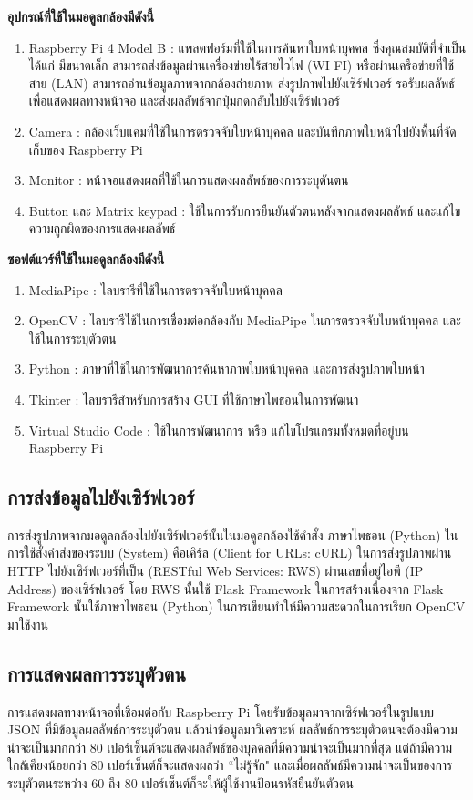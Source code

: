 \textbf{อุปกรณ์ที่ใช้ในมอดูลกล้องมีดังนี้}
\begin{enumerate}
  \item Raspberry Pi 4 Model B : แพลตฟอร์มที่ใช้ในการค้นหาใบหน้าบุคคล ซึ่งคุณสมบัติที่จำเป็นได้แก่ 
  มีขนาดเล็ก สามารถส่งข้อมูลผ่านเครื่องข่ายไร้สายไวไฟ (WI-FI) หรือผ่านเครือข่ายที่ใช้สาย (LAN) สามารถอ่านข้อมูลภาพจากกล้องถ่ายภาพ 
  ส่งรูปภาพไปยังเซิร์ฟเวอร์ รอรับผลลัพธ์เพื่อแสดงผลทางหน้าจอ และส่งผลลัพธ์จากปุ่มกดกลับไปยังเซิร์ฟเวอร์
  \item Camera : กล้องเว็บแคมที่ใช้ในการตรวจจับใบหน้าบุคคล และบันทึกภาพใบหน้าไปยังพื้นที่จัดเก็บของ Raspberry Pi
  \item Monitor : หน้าจอแสดงผลที่ใช้ในการแสดงผลลัพธ์ของการระบุตันตน
  \item Button และ Matrix keypad : ใช้ในการรับการยืนยันตัวตนหลังจากแสดงผลลัพธ์ และแก้ไขความถูกผิดของการแสดงผลลัพธ์
\end{enumerate}

\textbf{ซอฟต์แวร์ที่ใช้ในมอดูลกล้องมีดังนี้}
\begin{enumerate}
  \item MediaPipe : ไลบรารีที่ใช้ในการตรวจจับใบหน้าบุคคล
  \item OpenCV : ไลบรารีใช้ในการเชื่อมต่อกล้องกับ MediaPipe ในการตรวจจับใบหน้าบุคคล และใช้ในการระบุตัวตน
  \item Python : ภาษาที่ใช้ในการพัฒนาการค้นหาภาพใบหน้าบุคคล และการส่งรูปภาพใบหน้า
  \item Tkinter : ไลบรารีสำหรับการสร้าง GUI ที่ใช้ภาษาไพธอนในการพัฒนา
  \item Virtual Studio Code : ใช้ในการพัฒนาการ หรือ แก้ไขโปรแกรมทั้งหมดที่อยู่บน Raspberry Pi
\end{enumerate}

\subsection{การส่งข้อมูลไปยังเซิร์ฟเวอร์}
การส่งรูปภาพจากมอดูลกล้องไปยังเซิร์ฟเวอร์นั้นในมอดูลกล้องใช้คำสั่ง ภาษาไพธอน (Python) ในการใช้สั่งคำส่งของระบบ (System)
คือเคิร์ล  (Client for URLs: cURL) ในการส่งรูปภาพผ่าน HTTP ไปยังเซิร์ฟเวอร์ที่เป็น (RESTful Web Services: RWS)
ผ่านเลขที่อยู่ไอพี (IP Address) ของเซิร์ฟเวอร์ โดย RWS นั้นใช้ Flask Framework 
ในการสร้างเนื่องจาก Flask Framework นั้นใช้ภาษาไพธอน (Python) ในการเขียนทำให้มีความสะดวกในการเรียก OpenCV มาใช้งาน

\subsection{การแสดงผลการระบุตัวตน}
การแสดงผลทางหน้าจอที่เชื่อมต่อกับ Raspberry Pi โดยรับข้อมูลมาจากเซิร์ฟเวอร์ในรูปแบบ JSON ที่มีข้อมูลผลลัพธ์การระบุตัวตน แล้วนำข้อมูลมาวิเคราะห์
ผลลัพธ์การระบุตัวตนจะต้องมีความน่าจะเป็นมากกว่า 80 เปอร์เซ็นต์จะแสดงผลลัพธ์ของบุคคลที่มีความน่าจะเป็นมากที่สุด แต่ถ้ามีความใกล้เคียงน้อยกว่า 80 เปอร์เซ็นต์ก็จะแสดงผลว่า ``ไม่รู้จัก"
และเมื่อผลลัพธ์มีความน่าจะเป็นของการระบุตัวตนระหว่าง 60 ถึง 80 เปอร์เซ็นต์ก็จะให้ผู้ใช้งานป้อนรหัสยืนยันตัวตน


